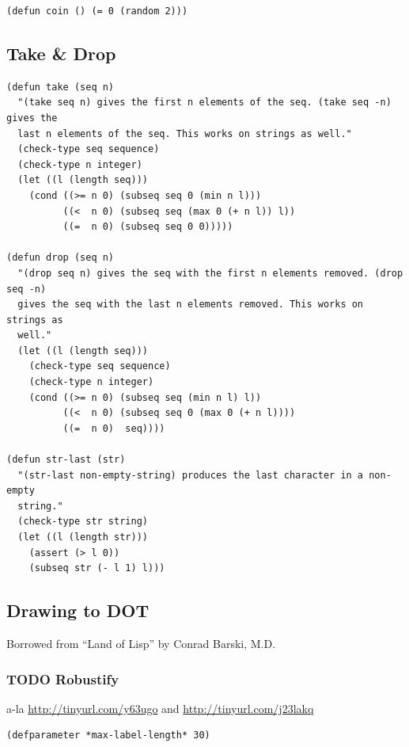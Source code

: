 \documentclass[10pt,oneside,x11names]{article}
\begin{document}
\begin{verbatim}
(defun coin () (= 0 (random 2)))
\end{verbatim}

\subsection{Take \& Drop}
\label{sec:org2458542}

\begin{verbatim}
(defun take (seq n)
  "(take seq n) gives the first n elements of the seq. (take seq -n) gives the
  last n elements of the seq. This works on strings as well."
  (check-type seq sequence)
  (check-type n integer)
  (let ((l (length seq)))
    (cond ((>= n 0) (subseq seq 0 (min n l)))
          ((<  n 0) (subseq seq (max 0 (+ n l)) l))
          ((=  n 0) (subseq seq 0 0)))))

(defun drop (seq n)
  "(drop seq n) gives the seq with the first n elements removed. (drop seq -n)
  gives the seq with the last n elements removed. This works on strings as
  well."
  (let ((l (length seq)))
    (check-type seq sequence)
    (check-type n integer)
    (cond ((>= n 0) (subseq seq (min n l) l))
          ((<  n 0) (subseq seq 0 (max 0 (+ n l))))
          ((=  n 0)  seq))))

(defun str-last (str)
  "(str-last non-empty-string) produces the last character in a non-empty
  string."
  (check-type str string)
  (let ((l (length str)))
    (assert (> l 0))
    (subseq str (- l 1) l)))
\end{verbatim}

\subsection{Drawing to DOT}
\label{sec:org13aedc1}

Borrowed from ``Land of Lisp'' by Conrad Barski, M.D.

\subsubsection{{\bfseries\sffamily TODO} Robustify}
\label{sec:org5d01729}

a-la \url{http://tinyurl.com/y63ugo} and \url{http://tinyurl.com/j23lakq}


\begin{verbatim}
(defparameter *max-label-length* 30)
\end{verbatim}
\end{document}
